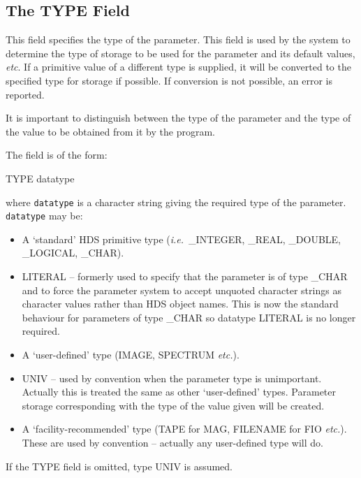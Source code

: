 \documentclass[twoside,11pt,nolof]{starlink}
\begin{document}
\subsection{The TYPE Field
\label{type}}

This field specifies the type of the parameter.
This field is used by the system to determine the type of storage to be
used for the parameter and its default values, \emph{etc}.
If a primitive value of a different type is supplied,
it will be converted to the specified type for storage if possible.
If conversion is not possible, an error is reported.

It is important to distinguish between the type of the parameter and the type
of the value to be obtained from it by the program.

The field is of the form:
\begin{terminalv}
TYPE datatype
\end{terminalv}
where \texttt{datatype} is a character string giving the required type of the
parameter.
\texttt{datatype} may be:
\begin{itemize}
\item A `standard' HDS primitive type (\emph{i.e.}\ \_INTEGER, \_REAL, \_DOUBLE, \_LOGICAL,
\_CHAR).
\item LITERAL -- formerly used to specify that the parameter is of type \_CHAR
and to force the parameter system to accept unquoted character strings as
character values rather than HDS object names.
This is now the standard behaviour for parameters of type \_CHAR so datatype
LITERAL is no longer required.
\item A `user-defined' type (IMAGE, SPECTRUM \emph{etc.}).
\item UNIV -- used by convention when the parameter type is unimportant.
Actually this is treated the same as other `user-defined' types.
Parameter storage corresponding with the type of the value given will be
created.
\item A `facility-recommended' type (TAPE for MAG, FILENAME for FIO \emph{etc.}).
These are used by convention -- actually any user-defined type will do.
\end{itemize}
If the TYPE field is omitted, type UNIV is assumed.
\end{document}

